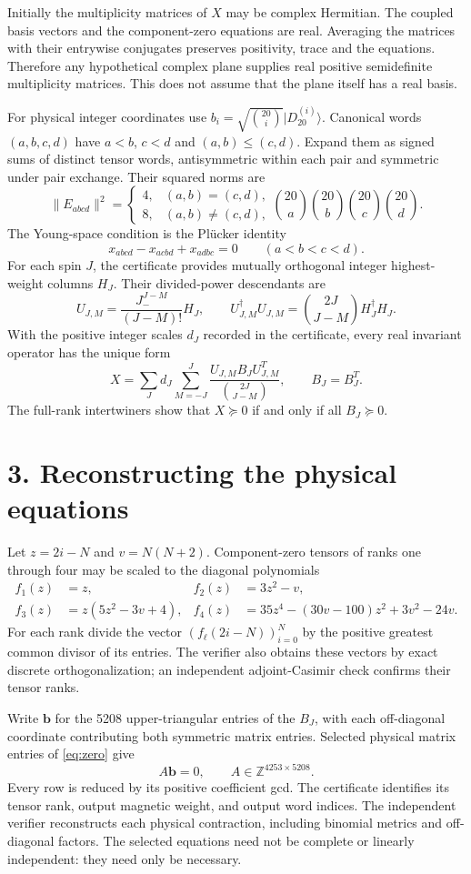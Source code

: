 \documentclass[11pt]{article}
\begin{document}
Initially the multiplicity matrices of $X$ may be complex Hermitian. The coupled basis vectors and the component-zero equations are real. Averaging the matrices with their entrywise conjugates preserves positivity, trace and the equations. Therefore any hypothetical complex plane supplies real positive semidefinite multiplicity matrices. This does not assume that the plane itself has a real basis.

For physical integer coordinates use $b_i=\sqrt{\binom{20}{i}}|D_{20}^{(i)}\rangle$. Canonical words $(a,b,c,d)$ have $a<b$, $c<d$ and $(a,b)\le(c,d)$. Expand them as signed sums of distinct tensor words, antisymmetric within each pair and symmetric under pair exchange. Their squared norms are
\[\|E_{abcd}\|^2=\begin{cases}4,&(a,b)=(c,d),\\8,&(a,b)\ne(c,d),\end{cases}\binom{20}{a}\binom{20}{b}\binom{20}{c}\binom{20}{d}.\]
The Young-space condition is the Pl\"ucker identity
\[x_{abcd}-x_{acbd}+x_{adbc}=0\qquad(a<b<c<d).\]
For each spin $J$, the certificate provides mutually orthogonal integer highest-weight columns $H_J$. Their divided-power descendants are
\[U_{J,M}=\frac{J_-^{J-M}}{(J-M)!}H_J,\qquad U_{J,M}^{\dagger}U_{J,M}=\binom{2J}{J-M}H_J^{\dagger}H_J.\]
With the positive integer scales $d_J$ recorded in the certificate, every real invariant operator has the unique form
\[X=\sum_Jd_J\sum_{M=-J}^{J}\frac{U_{J,M}B_JU_{J,M}^{T}}{\binom{2J}{J-M}},\qquad B_J=B_J^T.\]
The full-rank intertwiners show that $X\succeq0$ if and only if all $B_J\succeq0$.

\section*{3. Reconstructing the physical equations}
Let $z=2i-N$ and $v=N(N+2)$. Component-zero tensors of ranks one through four may be scaled to the diagonal polynomials
\begin{align*}
 f_1(z)&=z, & f_2(z)&=3z^2-v,\\
 f_3(z)&=z(5z^2-3v+4), & f_4(z)&=35z^4-(30v-100)z^2+3v^2-24v.
\end{align*}
For each rank divide the vector $(f_\ell(2i-N))_{i=0}^N$ by the positive greatest common divisor of its entries. The verifier also obtains these vectors by exact discrete orthogonalization; an independent adjoint-Casimir check confirms their tensor ranks.

Write $\mathbf b$ for the 5208 upper-triangular entries of the $B_J$, with each off-diagonal coordinate contributing both symmetric matrix entries. Selected physical matrix entries of \eqref{eq:zero} give
\[A\mathbf b=0,\qquad A\in\mathbb Z^{4253\times5208}.\]
Every row is reduced by its positive coefficient gcd. The certificate identifies its tensor rank, output magnetic weight, and output word indices. The independent verifier reconstructs each physical contraction, including binomial metrics and off-diagonal factors. The selected equations need not be complete or linearly independent: they need only be necessary.
\end{document}
